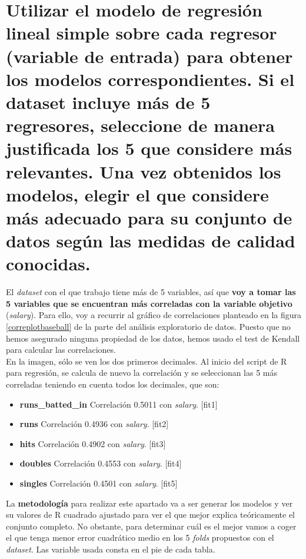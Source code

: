 \documentclass[a4paper,12pt, oneside]{book}
\begin{document}
\section[Regresión lineal simple]{Utilizar el modelo de regresión lineal simple sobre cada regresor (variable de entrada) para obtener los modelos correspondientes. Si el dataset incluye más de 5 regresores, seleccione de manera justificada los 5 que considere más relevantes. Una vez obtenidos los modelos, elegir el que considere más adecuado para su conjunto de datos según las medidas de calidad conocidas.}
El \textit{dataset} con el que trabajo tiene más de 5 variables, así que \textbf{voy a tomar las 5 variables que se encuentran más correladas con la variable objetivo} (\textit{salary}). Para ello, voy a recurrir al gráfico de correlaciones planteado en la figura \ref{correplotbaseball} de la parte del análisis exploratorio de datos. Puesto que no hemos asegurado ninguna propiedad de los datos, hemos usado el test de Kendall para calcular las correlaciones.\\

En la imagen, sólo se ven los dos primeros decimales. Al inicio del script de R para regresión, se calcula de nuevo la correlación y se seleccionan las 5 más correladas teniendo en cuenta todos los decimales, que son:\\

\begin{itemize}
	\item \textbf{runs\_batted\_in} Correlación 0.5011 con \textit{salary}. [fit1]
	\item \textbf{runs} Correlación 0.4936 con \textit{salary}. [fit2]
	\item \textbf{hits} Correlación 0.4902 con \textit{salary}. [fit3]
	\item \textbf{doubles} Correlación 0.4553 con \textit{salary}. [fit4]
	\item \textbf{singles} Correlación 0.4501 con \textit{salary}. [fit5]
\end{itemize}

La \textbf{metodología} para realizar este apartado va a ser generar los modelos y ver su valores de R cuadrado ajustado para ver el que mejor explica teóricamente el conjunto completo. No obstante, para determinar cuál es el mejor vamos a coger el que tenga menor error cuadrático medio en los 5 \textit{folds} propuestos con el \textit{dataset}. Las variable usada consta en el pie de cada tabla.
\end{document}
